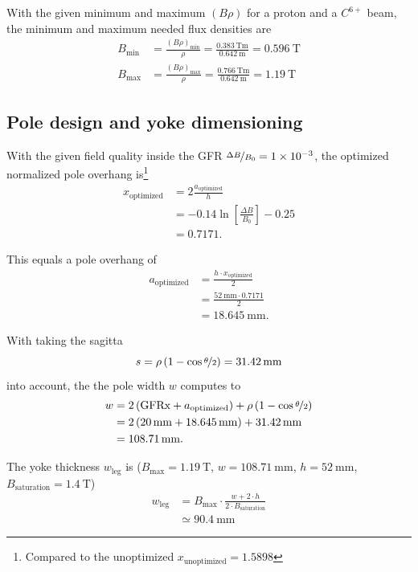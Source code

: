 \documentclass[10pt,a4paper,noendnumber=true]{scrartcl}
\begin{document}
With the given minimum and maximum $(B\rho)$ for a proton and a $C^{6+}$ beam, the minimum and maximum needed flux densities are
\begin{align}
    B_\text{min} &= \frac{(B \rho)_\text{min}}{\rho} = \frac{\SI{0.383}{\tesla\meter}}{\SI{0.642}{\meter}} = \SI{0.596}{\tesla}\\
    B_\text{max} &= \frac{(B \rho)_\text{max}}{\rho} = \frac{\SI{0.766}{\tesla\meter}}{\SI{0.642}{\meter}} = \SI{1.19}{\tesla}
\end{align}


\newpage
\subsection{Pole design and yoke dimensioning}
With the given field quality inside the GFR $\nicefrac{\Delta B}{B_0} = \num{1e-3}$,
the optimized normalized pole overhang is\footnote{Compared to the unoptimized $x_\text{unoptimized}= 1.5898$}
\begin{align}
    x_\text{optimized} &= 2\frac{a_\text{optimized}}{h} \\
    &= -0.14 \ln\left[\frac{\Delta B}{B_0}\right] -0.25 \nonumber\\
    &= 0.7171. \nonumber
\end{align}

This equals a pole overhang of
\begin{align}
    a_\text{optimized} &= \frac{h\cdot x_\text{optimized}}{2} \\
    &= \frac{\SI{52}{\mm} \cdot 0.7171}{2} \nonumber\\
    &= \SI{18.645}{\mm}.\nonumber
\end{align}

With taking the sagitta
\begin{equation}
    s= \rho\left(1-\cos \nicefrac{\theta}{2}\right)
    = \SI{31.42}{\mm} 
\end{equation}
into account, the the pole width $w$ computes to
\begin{align}
	w & =  2 \left(\text{GFRx} + a_\text{optimized}\right) +  \rho\left(1-\cos \nicefrac{\theta}{2}\right)          \\
	  & =  2 \left(\SI{20}{\mm} + \SI{18.645}{\mm}\right) + \SI{31.42}{\mm}\nonumber \\
	  & = \SI{108.71}{\mm}. \nonumber
\end{align}

The yoke thickness $w_\text{leg}$ is ($B_\text{max} = \SI{1.19}{\tesla}$, $w = \SI{108.71}{\mm}$, $h = \SI{52}{\mm}$, $B_\text{saturation} = \SI{1.4}{\tesla}$)
\begin{align}
w_\text{leg} &= B_\text{max} \cdot \frac{w + 2 \cdot h}{2 \cdot B_\text{saturation}} \\
&\simeq \SI{90.4}{\mm}
\end{align}
\end{document}
